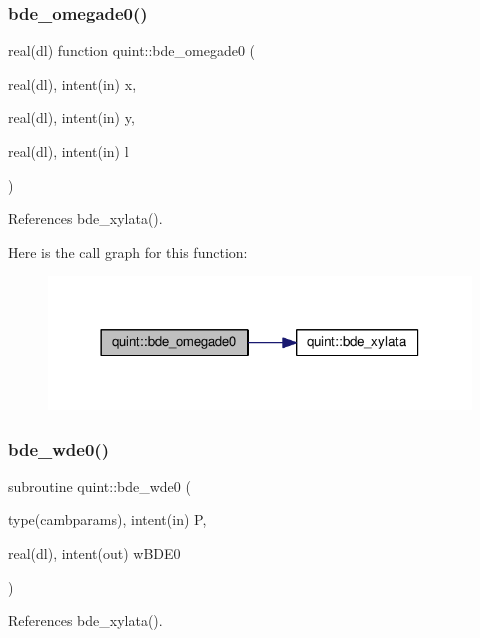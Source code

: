 \subsubsection{\texorpdfstring{bde\+\_\+omegade0()}{bde\_omegade0()}}
{\footnotesize\ttfamily real(dl) function quint\+::bde\+\_\+omegade0 (\begin{DoxyParamCaption}\item[{real(dl), intent(in)}]{x,  }\item[{real(dl), intent(in)}]{y,  }\item[{real(dl), intent(in)}]{l }\end{DoxyParamCaption})}



References bde\+\_\+xylata().

Here is the call graph for this function\+:
\nopagebreak
\begin{figure}[H]
\begin{center}
\leavevmode
\includegraphics[width=318pt]{namespacequint_ae1b7ac10a36d63310cbfe418b53b9684_cgraph}
\end{center}
\end{figure}
\mbox{\label{namespacequint_aab2e2c5f2a7e9e56f0852539b0933259}} 
\subsubsection{\texorpdfstring{bde\+\_\+wde0()}{bde\_wde0()}}
{\footnotesize\ttfamily subroutine quint\+::bde\+\_\+wde0 (\begin{DoxyParamCaption}\item[{type(cambparams), intent(in)}]{P,  }\item[{real(dl), intent(out)}]{w\+B\+D\+E0 }\end{DoxyParamCaption})}



References bde\+\_\+xylata().

